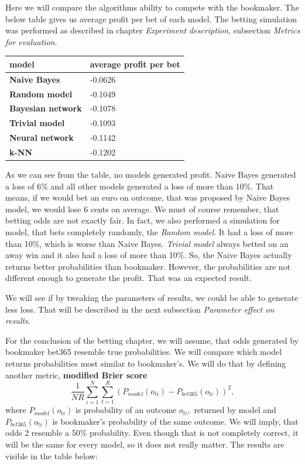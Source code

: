 \documentclass[conference]{IEEEtran}
\begin{document}
Here we will compare the algorithms ability to compete with the bookmaker. The below table
gives us average profit per bet of each model. The betting simulation was performed as
described in chapter \textit{Experiment description}, subsection \textit{Metrics for
evaluation}.

\begin{table}[!ht]
    \centering
    \begin{tabular}{|l|l|}
    \hline
        \textbf{model} & average profit per bet \\ \hline
        \textbf{Naive Bayes} & -0.0626 \\ \hline
        \textbf{Random model} & -0.1049 \\ \hline
        \textbf{Bayesian network} & -0.1078 \\ \hline
        \textbf{Trivial model} & -0.1093 \\ \hline
        \textbf{Neural network} & -0.1142 \\ \hline
        \textbf{k-NN} & -0.1202 \\ \hline
    \end{tabular}
\end{table}

As we can see from the table, no models generated profit. Naive Bayes generated a loss of 6\%
and all other models generated a loss of more than 10\%. That means, if we would bet an euro 
on outcome, that was proposed by Naive Bayes model, we would lose 6 cents on average. We must of course
remember, that betting odds are not exactly fair. In fact, we also performed a simulation for 
model, that bets completely randomly, the \textit{Random model}. It had a loss of more than 10\%,
which is worse than Naive Bayes. \textit{Trivial model} always betted on an away win and it also 
had a loss of more than 10\%. So, the Naive Bayes actually returns better probabilities than 
bookmaker. However, the probabilities are not different enough to generate the profit. That was 
an expected result.

We will see if by tweaking the parameters of results, we could be able to generate less loss.
That will be described in the next subsection \textit{Parameter effect on results}.

For the conclusion of the betting chapter, we will assume, that odds generated by bookmaker
bet365 resemble true probabilities. We will compare which model returns probabilities most similar to
bookmaker's. We will do that by defining another metric, \textbf{modified Brier score}
$$\frac{1}{N R} \sum_{i=1}^{N} \sum_{t=1}^{R} {(P_{model}(o_{ti}) - P_{bet365}(o_{ti}))^2},$$
where $P_{model}(o_{ti})$ is probability of an outcome $o_{ti},$ returned by model and 
$P_{bet365}(o_{ti})$ is bookmaker's probability of the same outcome. We will imply, that 
odds 2 resemble a 50\% probability. Even though that is not completely correct, it will be 
the same for every model, so it does not really matter. The results are visible in the table
below:
\end{document}
